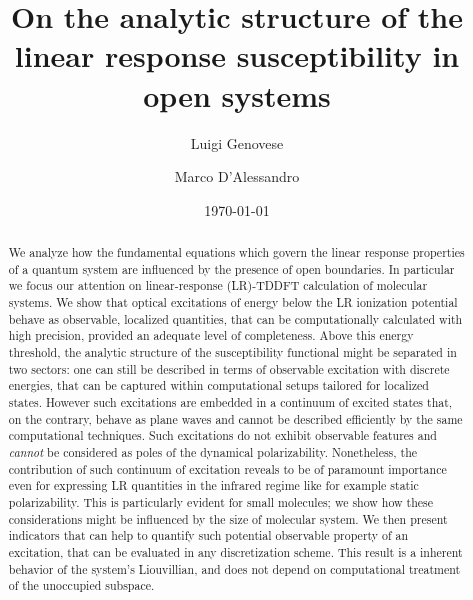 \documentclass[reprint,aps,prb]{revtex4-1}
\begin{document}

\title{On the analytic structure of the linear response susceptibility in open systems}

\author{Luigi Genovese}
\author{Marco D'Alessandro}%

\date{\today}

\begin{abstract}
We analyze how the fundamental equations which govern the linear response properties of a quantum system are influenced by the presence of open boundaries.
In particular we focus our attention on linear-response (LR)-TDDFT calculation of molecular systems. We show that optical excitations of energy below the LR ionization potential 
behave as observable, localized quantities, that can be computationally calculated with high precision, provided an adequate level of completeness.
Above this energy threshold, the analytic structure of the susceptibility functional might be separated in two sectors: one can still be described in terms of observable excitation 
with discrete energies, that can be captured within computational setups tailored for localized states. However such excitations are embedded in a continuum of excited states 
that, on the contrary, behave as plane waves and cannot be described efficiently by the same computational techniques. Such excitations do not exhibit observable features and 
\emph{cannot} be considered as poles of the dynamical polarizability. Nonetheless, the contribution of such continuum of excitation reveals to be of paramount importance even 
for expressing LR quantities in the infrared regime like for example static polarizability.
This is particularly evident for small molecules; we show how these considerations might be influenced by the size of molecular system.
We then present indicators that can help to quantify such potential observable property of an excitation, that can be evaluated 
in any discretization scheme.  This result is a inherent behavior of the system's Liouvillian, and does not depend on computational treatment of the 
unoccupied subspace.
\end{abstract}

\maketitle
\end{document}
